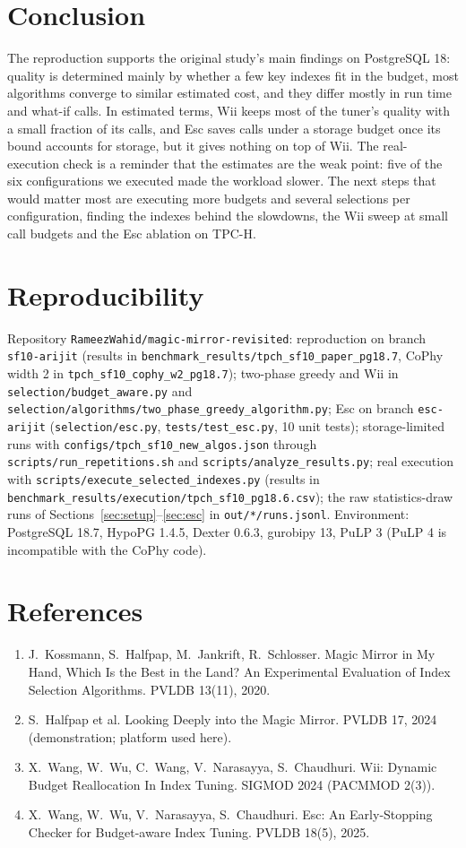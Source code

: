 \documentclass[11pt,a4paper]{article}
\begin{document}
\section{Conclusion}
The reproduction supports the original study's main findings on PostgreSQL 18: quality is determined mainly by whether a few key indexes fit in the budget, most algorithms converge to similar estimated cost, and they differ mostly in run time and what-if calls. In estimated terms, Wii keeps most of the tuner's quality with a small fraction of its calls, and Esc saves calls under a storage budget once its bound accounts for storage, but it gives nothing on top of Wii. The real-execution check is a reminder that the estimates are the weak point: five of the six configurations we executed made the workload slower. The next steps that would matter most are executing more budgets and several selections per configuration, finding the indexes behind the slowdowns, the Wii sweep at small call budgets and the Esc ablation on TPC-H.

\section*{Reproducibility}\begingroup\raggedright
Repository \texttt{RameezWahid/magic-mirror-revisited}: reproduction on branch \texttt{sf10-arijit} (results in \texttt{benchmark\_results/tpch\_sf10\_paper\_pg18.7}, CoPhy width 2 in \texttt{tpch\_sf10\_cophy\_w2\_pg18.7}); two-phase greedy and Wii in \texttt{selection/budget\_aware.py} and \texttt{selection/algorithms/two\_phase\_greedy\_algorithm.py}; Esc on branch \texttt{esc-arijit} (\texttt{selection/esc.py}, \texttt{tests/test\_esc.py}, 10 unit tests); storage-limited runs with \texttt{configs/tpch\_sf10\_new\_algos.json} through \texttt{scripts/run\_repetitions.sh} and \texttt{scripts/analyze\_results.py}; real execution with \texttt{scripts/execute\_selected\_indexes.py} (results in \texttt{benchmark\_results/execution/tpch\_sf10\_pg18.6.csv}); the raw statistics-draw runs of Sections~\ref{sec:setup}--\ref{sec:esc} in \texttt{out/*/runs.jsonl}. Environment: PostgreSQL 18.7, HypoPG 1.4.5, Dexter 0.6.3, gurobipy 13, PuLP 3 (PuLP 4 is incompatible with the CoPhy code).

\endgroup
\section*{References}
\begin{enumerate}\small
\item J.\ Kossmann, S.\ Halfpap, M.\ Jankrift, R.\ Schlosser. Magic Mirror in My Hand, Which Is the Best in the Land? An Experimental Evaluation of Index Selection Algorithms. PVLDB 13(11), 2020.
\item S.\ Halfpap et al. Looking Deeply into the Magic Mirror. PVLDB 17, 2024 (demonstration; platform used here).
\item X.\ Wang, W.\ Wu, C.\ Wang, V.\ Narasayya, S.\ Chaudhuri. Wii: Dynamic Budget Reallocation In Index Tuning. SIGMOD 2024 (PACMMOD 2(3)).
\item X.\ Wang, W.\ Wu, V.\ Narasayya, S.\ Chaudhuri. Esc: An Early-Stopping Checker for Budget-aware Index Tuning. PVLDB 18(5), 2025.
\end{enumerate}
\end{document}
